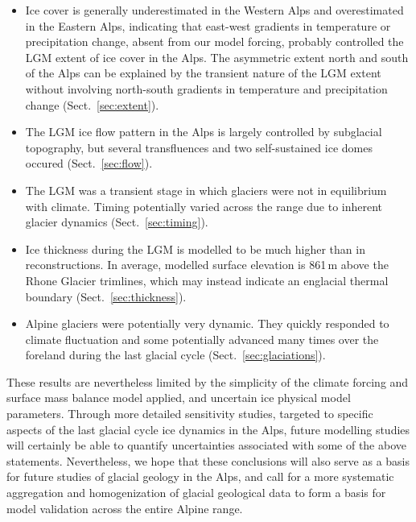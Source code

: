 \documentclass[tc, manuscript]{copernicus}
\begin{document}
    \begin{itemize}
      \item Ice cover is generally underestimated in the Western Alps and
            overestimated in the Eastern Alps, indicating that east-west
            gradients in temperature or precipitation change, absent from our
            model forcing, probably controlled the LGM extent of ice cover in
            the Alps. The asymmetric extent north and south of the Alps
            can be explained by the transient nature of the LGM extent without
            involving north-south gradients in temperature and precipitation
            change (Sect.~\ref{sec:extent}).
      \item The LGM ice flow pattern in the Alps is largely controlled by
            subglacial topography, but several transfluences and two
            self-sustained ice domes occured (Sect.~\ref{sec:flow}).
      \item The LGM was a transient stage in which glaciers were not in
            equilibrium with climate. Timing potentially varied across the
            range due to inherent glacier dynamics (Sect.~\ref{sec:timing}).
      \item Ice thickness during the LGM is modelled to be much higher than in
            reconstructions. In average, modelled surface elevation is 861\,m
            above the Rhone Glacier trimlines, which may instead indicate an
            englacial thermal boundary (Sect.~\ref{sec:thickness}).
      \item Alpine glaciers were potentially very dynamic. They quickly
            responded to climate fluctuation and some potentially advanced many
            times over the foreland during the last glacial cycle
            (Sect.~\ref{sec:glaciations}).
    \end{itemize}

    These results are nevertheless limited by the simplicity of the climate
    forcing and surface mass balance model applied, and uncertain ice physical
    model parameters. Through more detailed sensitivity studies, targeted to
    specific aspects of the last glacial cycle ice dynamics in the Alps, future
    modelling studies will certainly be able to quantify uncertainties
    associated with some of the above statements. Nevertheless, we hope that
    these conclusions will also serve as a basis for future studies of glacial
    geology in the Alps, and call for a more systematic aggregation and
    homogenization of glacial geological data to form a basis for model
    validation across the entire Alpine range.
\end{document}
